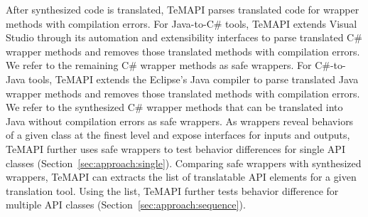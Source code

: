 After synthesized code is translated, TeMAPI parses translated code for wrapper methods with compilation errors. For Java-to-C\# tools, TeMAPI extends Visual Studio through its automation and extensibility interfaces to parse translated C\# wrapper methods and removes those translated methods with compilation errors. We refer to the remaining C\# wrapper methods as safe wrappers. For C\#-to-Java tools, TeMAPI extends the Eclipse's Java compiler to parse translated Java wrapper methods and removes those translated methods with compilation errors. We refer to the synthesized C\# wrapper methods that can be translated into Java without compilation errors as safe wrappers. As wrappers reveal behaviors of a given class at the finest level and expose interfaces for inputs and outputs, TeMAPI further uses safe wrappers to test behavior differences for single API classes (Section~\ref{sec:approach:single}). Comparing safe wrappers with synthesized wrappers, TeMAPI can extracts the list of translatable API elements for a given translation tool. Using the list, TeMAPI further tests behavior difference for multiple API classes (Section~\ref{sec:approach:sequence}).


%


